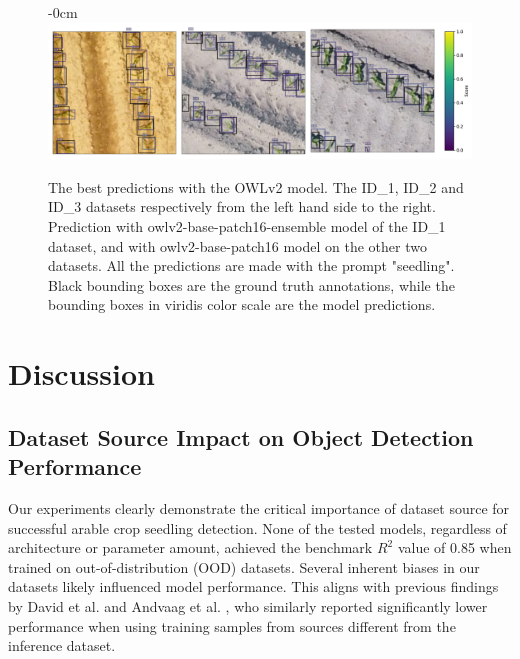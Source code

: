 \documentclass[12pt,a4paper,oneside]{report}
\newlength{\extralength}
\begin{document}
\begin{figure}[H]
  \begin{adjustwidth}{-\extralength}{0cm}
  \includegraphics[width=18cm]{Plots/zeroshot_images.pdf}
  \caption{The best predictions with the OWLv2 model.  
  The ID\_1, ID\_2 and ID\_3 datasets respectively from the left hand side to the right.
  Prediction with owlv2-base-patch16-ensemble model of the ID\_1 dataset,
  and with owlv2-base-patch16 model on the other two datasets.
  All the predictions are made with the prompt "seedling".
  Black bounding boxes are the ground truth annotations, while the bounding boxes 
  in viridis color scale are the model predictions.}
  \label{fig:annotations_zero-shots}
\end{adjustwidth}
\end{figure}

\section{Discussion}

\subsection{Dataset Source Impact on Object Detection Performance}
Our experiments clearly demonstrate the critical importance of dataset source 
for successful arable crop seedling detection. None of the tested models, regardless 
of architecture or parameter amount, achieved the benchmark $R^2$ value of 0.85 
when trained on out-of-distribution (OOD) datasets. 
Several inherent biases in our datasets likely influenced model performance.
This aligns with previous findings 
by David et al. \cite{davidPlantDetectionCounting2021}  and Andvaag et al. \cite{andvaagCountingCanolaGeneralizable2024}, 
who similarly reported significantly 
lower performance when using training samples from sources different from the inference dataset.
\end{document}
